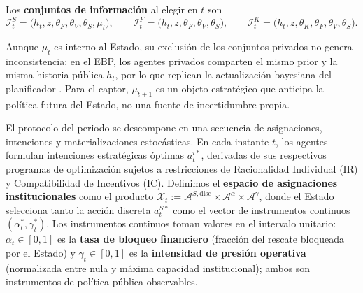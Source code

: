 \documentclass[12pt]{article}
\providecommand{\textcite}{\citet}
\theoremstyle{definition}
\theoremstyle{remark}
\newcommand{\1}{\mathbf{1}}
\begin{document}
Los \textbf{conjuntos de información} al elegir en $t$ son
\[
\mathcal{I}_t^S = \bigl(h_t, z, \theta_F, \theta_V, \theta_S, \mu_t\bigr),
\qquad
\mathcal{I}_t^F = \bigl(h_t, z, \theta_F, \theta_V, \theta_S\bigr),
\qquad
\mathcal{I}_t^K = \bigl(h_t, z, \theta_K, \theta_F, \theta_V, \theta_S\bigr).
\]

Aunque $\mu_t$ es interno al Estado, su exclusión de los conjuntos privados no genera inconsistencia: en el EBP, los agentes privados comparten el mismo prior y la misma historia pública $h_t$, por lo que replican la actualización bayesiana del planificador \textcite{FudenbergTirole1991}. Para el captor, $\mu_{t+1}$ es un objeto estratégico que anticipa la política futura del Estado, no una fuente de incertidumbre propia.

El protocolo del periodo se descompone en una secuencia de asignaciones, intenciones y materializaciones estocásticas. En cada instante $t$, los agentes formulan intenciones estratégicas óptimas $a_t^{i\ast}$, derivadas de sus respectivos programas de optimización sujetos a restricciones de Racionalidad Individual (IR) y Compatibilidad de Incentivos (IC). Definimos el \textbf{espacio de asignaciones institucionales} como el producto $\mathcal{X}_t := \mathcal{A}^{S,\mathrm{disc}} \times \mathcal{A}^{\alpha} \times \mathcal{A}^{\gamma}$, donde el Estado selecciona tanto la acción discreta $a_t^{S\ast}$ como el vector de instrumentos continuos $(\alpha_t^\ast, \gamma_t^\ast)$. Los instrumentos continuos toman valores en el intervalo unitario: $\alpha_t\in[0,1]$ es la \textbf{tasa de bloqueo financiero} \textup{(}fracción del rescate bloqueada por el Estado\textup{)} y $\gamma_t\in[0,1]$ es la \textbf{intensidad de presión operativa} \textup{(}normalizada entre nula y máxima capacidad institucional\textup{)}; ambos son instrumentos de política pública observables.
\end{document}
